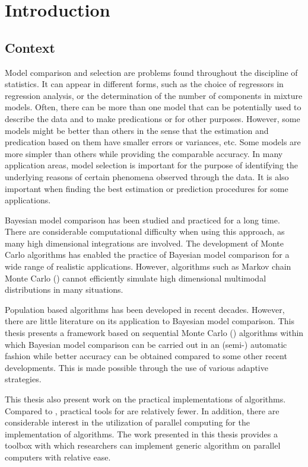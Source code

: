 \chapter{Introduction}
\label{cha:Introduction}

\section{Context}
\label{sec:Context}

Model comparison and selection are problems found throughout the discipline of
statistics. It can appear in different forms, such as the choice of regressors
in regression analysis, or the determination of the number of components in
mixture models. Often, there can be more than one model that can be
potentially used to describe the data and to make predications or for other
purposes. However, some models might be better than others in the sense that
the estimation and predication based on them have smaller errors or variances,
etc. Some models are more simpler than others while providing the comparable
accuracy. In many application areas, model selection is important for the
purpose of identifying the underlying reasons of certain phenomena observed
through the data. It is also important when finding the best estimation or
prediction procedures for some applications.

Bayesian model comparison has been studied and practiced for a long time.
There are considerable computational difficulty when using this approach, as
many high dimensional integrations are involved. The development of Monte
Carlo algorithms has enabled the practice of Bayesian model comparison for a
wide range of realistic applications. However, algorithms such as Markov chain
Monte Carlo (\mcmc) cannot efficiently simulate high dimensional multimodal
distributions in many situations.

Population based algorithms has been developed in recent decades. However,
there are little literature on its application to Bayesian model comparison.
This thesis presents a framework based on sequential Monte Carlo (\smc)
algorithms within which Bayesian model comparison can be carried out in an
(semi-) automatic fashion while better accuracy can be obtained compared to
some other recent developments. This is made possible through the use of
various adaptive strategies.

This thesis also present work on the practical implementations of \smc
algorithms. Compared to \mcmc, practical tools for \smc are relatively fewer.
In addition, there are considerable interest in the utilization of parallel
computing for the implementation of \smc algorithms. The work presented in
this thesis provides a toolbox with which researchers can implement generic
\smc algorithm on parallel computers with relative ease.


